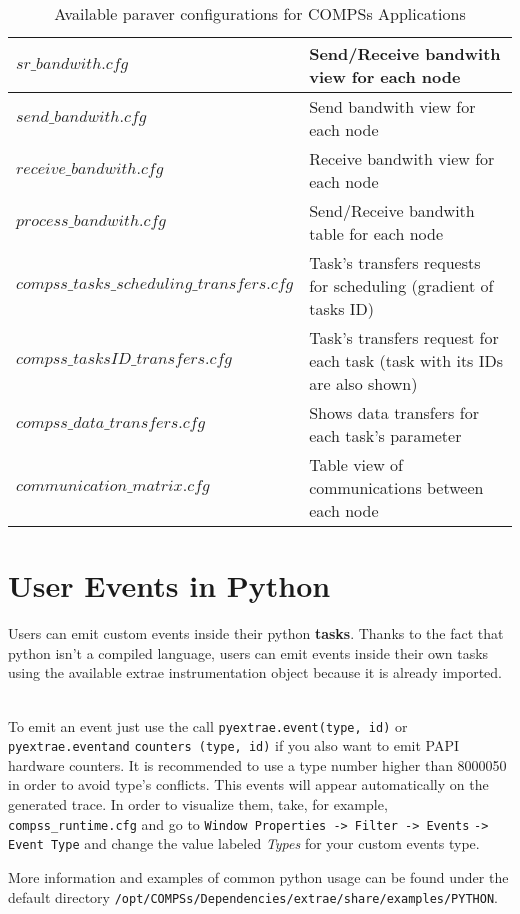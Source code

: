 \newpage

\bgroup
  \def\arraystretch{1.5}
  \begin{table}[!ht]
    \begin{center}
      \begin{tabular}{| p{} | p{} |}
	\hline
	$sr\_bandwith.cfg$ 			& Send/Receive bandwith view for each node \\ \hline
	$send\_bandwith.cfg$ 			& Send bandwith view for each node \\ \hline
	$receive\_bandwith.cfg$ 		& Receive bandwith view for each node \\ \hline
	$process\_bandwith.cfg$ 		& Send/Receive bandwith table for each node \\ \hline
	$compss\_tasks\_scheduling\_transfers.cfg$ 		& Task's transfers requests for scheduling (gradient of tasks ID) \\ \hline
	$compss\_tasksID\_transfers.cfg$ 	& Task's transfers request for each task (task with its IDs are also shown) \\ \hline
	$compss\_data\_transfers.cfg$ 		& Shows data transfers for each task's parameter \\ \hline
	$communication\_matrix.cfg$ 		& Table view of communications between each node \\ \hline
      \end{tabular}
      \caption{Available paraver configurations for COMPSs Applications}
      \label{tab:paraver_configs_comm}
    \end{center}
  \end{table}
\egroup


\section{User Events in Python}

Users can emit custom events inside their python \textbf{tasks}. Thanks to the fact that python isn't a compiled language, 
users can emit events inside their own tasks using the available extrae instrumentation object because it is already imported.
~ \newline

To emit an event just use the call \verb|pyextrae.event(type, id)| or \verb|pyextrae.eventand| \verb|counters (type, id)|
if you also want to emit PAPI hardware counters. It is recommended to use a type number higher than 8000050 in order 
to avoid type's conflicts. This events will appear automatically on the generated trace. In order to visualize them, take, 
for example, \verb|compss_runtime.cfg| and go to \verb|Window Properties -> Filter -> Events| \verb|-> Event Type| and change the 
value labeled \textit{Types} for your custom events type.
~ \newline

More information and examples of common python usage can be found under the default directory 
\verb|/opt/COMPSs/Dependencies/extrae/share/examples/PYTHON|.
